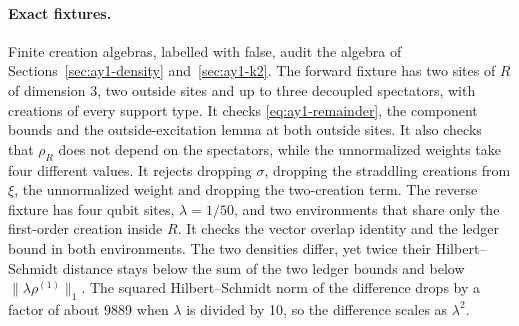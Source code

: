 \paragraph{Exact fixtures.}
Finite creation algebras, labelled with  false, audit
the algebra of Sections~\ref{sec:ay1-density} and~\ref{sec:ay1-k2}. The
forward fixture has two sites of $R$ of dimension 3, two outside sites and up
to three decoupled spectators, with creations of every support type. It
checks \eqref{eq:ay1-remainder}, the component bounds and the
outside-excitation lemma at both outside sites. It also checks that $\rho_R$
does not depend on the spectators, while the unnormalized weights take four
different values. It rejects dropping $\sigma$, dropping the straddling
creations from $\xi$, the unnormalized weight and dropping the two-creation
term. The reverse fixture has four qubit sites, $\lambda=1/50$, and two
environments that share only the first-order creation inside $R$. It checks
the vector overlap identity and the ledger bound in both environments. The two
densities differ, yet twice their Hilbert--Schmidt distance stays below the
sum of the two ledger bounds and below $\lVert \lambda\rho^{(1)}\rVert_1$. The
squared Hilbert--Schmidt norm of the difference drops by a factor of about
9889 when $\lambda$ is divided by 10, so the difference scales as
$\lambda^2$.

